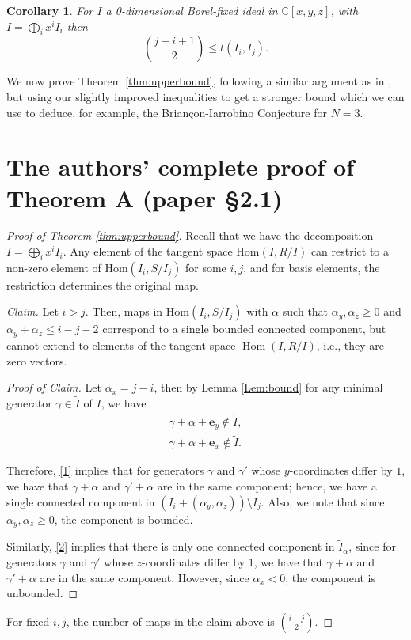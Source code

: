 \documentclass[10pt,a4paper]{amsart}
\newcommand{\BC}{{\mathbb{C}}}
\newcommand\Hom{\operatorname{Hom}}
\newtheorem{corollary}{Corollary}
\begin{document}
\begin{corollary}\label{cor:tlowerbound}
    For $I$ a 0-dimensional Borel-fixed ideal in $\BC[x,y,z]$, with $I=\bigoplus_ix^iI_i$ then
    \[\binom{j-i+1}{2} \leq t(I_i,I_j).\]
\end{corollary}

We now prove Theorem \ref{thm:upperbound}, following a similar argument as in \cite{Ramkumar-Sammartano}, but using our slightly improved inequalities to get a stronger bound which we can use to deduce, for example, the Briançon-Iarrobino Conjecture for $N=3$.

\section*{The authors' complete proof of Theorem A (paper \S2.1)}
\begin{proof}[Proof of Theorem \ref{thm:upperbound}]
Recall that we have the decomposition $I=\bigoplus_ix^iI_i$. Any element of the tangent space $\mathrm{Hom}(I,R/I)$ can restrict to a non-zero element of $\mathrm{Hom}(I_i,S/I_j)$ for some $i,j$, and for basis elements, the restriction determines the original map. 

\emph{Claim.} Let $i>j$. Then, maps in $\mathrm{Hom}(I_i,S/I_j)$ with $\alpha$ such that $\alpha_y,\alpha_z\geq0$ and $\alpha_y+\alpha_z\leq i-j-2$ correspond to a single bounded connected component, but cannot extend to elements of the tangent space $\Hom(I,R/I)$, i.e., they are zero vectors.

\begin{proof}[Proof of Claim]
    Let $\alpha_x=j-i$, then by Lemma \ref{Lem:bound} for any minimal generator $\gamma\in\tilde{I}$ of $I$, we have
   \begin{align}
\gamma+\alpha+\mathbf{e}_y \notin \tilde{I},\label{1}\\
\gamma+\alpha+\mathbf{e}_x\notin\tilde{I}\label{2}.
   \end{align}
   
   Therefore, \eqref{1} implies that for generators $\gamma$ and $\gamma'$ whose $y$-coordinates differ by $1$, we have that $\gamma+\alpha$ and $\gamma'+\alpha$ are in the same component; hence, we have a single connected component in $(I_i+(\alpha_y,\alpha_z))\setminus I_j$. Also, we note that since $\alpha_y,\alpha_z\geq0$, the component is bounded.

    Similarly, \eqref{2} implies that there is only one connected component in $\tilde{I}_\alpha$, since for generators $\gamma$ and $\gamma'$ whose $z$-coordinates differ by 1, we have that  $\gamma+\alpha$ and $\gamma'+\alpha$ are in the same component. However, since $\alpha_x<0$, the component is unbounded.
\end{proof}
For fixed $i,j$, the number of maps in the claim above is $\binom{i-j}{2}$.


\end{proof}
\end{document}
